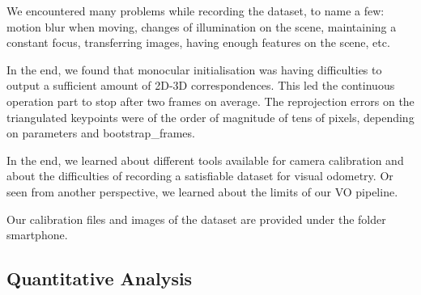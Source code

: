 We encountered many problems while recording the dataset, to name a few: motion blur when moving, changes of illumination on the scene,
maintaining a constant focus, transferring images, having enough features on the scene, etc.

In the end, we found that monocular initialisation was having difficulties to output a sufficient amount of 2D-3D correspondences.
This led the continuous operation part to stop after two frames on average. The reprojection errors on the triangulated keypoints were of
the order of magnitude of tens of pixels, depending on parameters and bootstrap\_frames.

In the end, we learned about different tools available for camera calibration and about the difficulties of recording a satisfiable dataset
for visual odometry. Or seen from another perspective, we learned about the limits of our VO pipeline.

Our calibration files and images of the dataset are provided under the folder smartphone.

\subsection{Quantitative Analysis}
